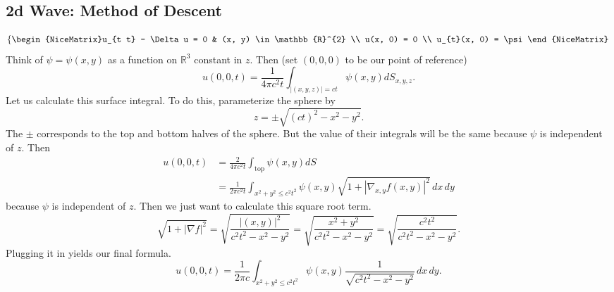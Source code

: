 \subsection{2d Wave: Method of Descent}
\[ \left\{\begin{NiceMatrix}u_{t t} - \Delta u = 0 & (x, y) \in \mathbb{R}^{2} \\ u(x, 0) = 0 \\ u_{t}(x, 0) = \psi\end{NiceMatrix}\right.  \]
Think of \( \psi = \psi(x, y) \) as a function on \( \mathbb{R}^{3} \) constant in \( z \). Then (set \( (0, 0, 0) \) to be our point of reference)
\[ u(0, 0, t) = \frac{1}{4 \pi c^{2} t} \int_{|(x, y, z)| = ct} \psi(x, y) dS_{x, y, z}. \]
Let us calculate this surface integral. To do this, parameterize the sphere by
\[ z = \pm \sqrt{(ct)^{2} - x^{2} - y^{2}}. \]
The \( \pm \) corresponds to the top and bottom halves of the sphere. But the value of their integrals will be the same because \( \psi \) is independent of \( z \). Then
\begin{align*}
	u(0, 0, t) &= \frac{2}{4 \pi c^{2} t} \int_{\text{top}} \psi(x, y) dS \\
						 &= \frac{1}{2 \pi c^{2} t} \int_{x^{2} + y^{2} \le c^{2} t^{2}} \psi(x, y) \sqrt{1 + \left| \nabla_{x, y}f(x, y) \right|^{2}}\, dx\, dy
\end{align*}
because \( \psi \) is independent of \( z \). Then we just want to calculate this square root term.
\[ \sqrt{1 + | \nabla f|^{2}} = \sqrt{\frac{|(x, y)|^{2}}{c^{2}t^{2} - x^{2} - y^{2}}} = \sqrt{\frac{x^{2} + y^{2}}{c^{2}t^{2} - x^{2} - y^{2}}} = \sqrt{\frac{c^{2}t^{2}}{c^{2}t^{2} - x^{2} - y^{2}}}. \]
Plugging it in yields our final formula.
\[ u(0, 0, t) = \frac{1}{2 \pi c} \int_{x^{2} + y^{2} \le c^{2} t^{2}} \psi(x, y) \frac{1}{\sqrt{c^{2}t^{2} - x^{2} - y^{2}}} \, dx\, dy.  \]




